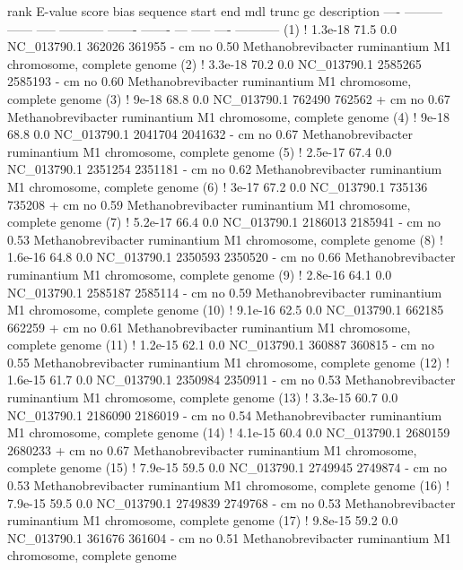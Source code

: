 \begin{sreoutput}
 rank     E-value  score  bias  sequence      start     end   mdl trunc   gc  description
 ----   --------- ------ -----  ----------- ------- -------   --- ----- ----  -----------
  (1) !   1.3e-18   71.5   0.0  NC_013790.1  362026  361955 -  cm    no 0.50  Methanobrevibacter ruminantium M1 chromosome, complete genome
  (2) !   3.3e-18   70.2   0.0  NC_013790.1 2585265 2585193 -  cm    no 0.60  Methanobrevibacter ruminantium M1 chromosome, complete genome
  (3) !     9e-18   68.8   0.0  NC_013790.1  762490  762562 +  cm    no 0.67  Methanobrevibacter ruminantium M1 chromosome, complete genome
  (4) !     9e-18   68.8   0.0  NC_013790.1 2041704 2041632 -  cm    no 0.67  Methanobrevibacter ruminantium M1 chromosome, complete genome
  (5) !   2.5e-17   67.4   0.0  NC_013790.1 2351254 2351181 -  cm    no 0.62  Methanobrevibacter ruminantium M1 chromosome, complete genome
  (6) !     3e-17   67.2   0.0  NC_013790.1  735136  735208 +  cm    no 0.59  Methanobrevibacter ruminantium M1 chromosome, complete genome
  (7) !   5.2e-17   66.4   0.0  NC_013790.1 2186013 2185941 -  cm    no 0.53  Methanobrevibacter ruminantium M1 chromosome, complete genome
  (8) !   1.6e-16   64.8   0.0  NC_013790.1 2350593 2350520 -  cm    no 0.66  Methanobrevibacter ruminantium M1 chromosome, complete genome
  (9) !   2.8e-16   64.1   0.0  NC_013790.1 2585187 2585114 -  cm    no 0.59  Methanobrevibacter ruminantium M1 chromosome, complete genome
 (10) !   9.1e-16   62.5   0.0  NC_013790.1  662185  662259 +  cm    no 0.61  Methanobrevibacter ruminantium M1 chromosome, complete genome
 (11) !   1.2e-15   62.1   0.0  NC_013790.1  360887  360815 -  cm    no 0.55  Methanobrevibacter ruminantium M1 chromosome, complete genome
 (12) !   1.6e-15   61.7   0.0  NC_013790.1 2350984 2350911 -  cm    no 0.53  Methanobrevibacter ruminantium M1 chromosome, complete genome
 (13) !   3.3e-15   60.7   0.0  NC_013790.1 2186090 2186019 -  cm    no 0.54  Methanobrevibacter ruminantium M1 chromosome, complete genome
 (14) !   4.1e-15   60.4   0.0  NC_013790.1 2680159 2680233 +  cm    no 0.67  Methanobrevibacter ruminantium M1 chromosome, complete genome
 (15) !   7.9e-15   59.5   0.0  NC_013790.1 2749945 2749874 -  cm    no 0.53  Methanobrevibacter ruminantium M1 chromosome, complete genome
 (16) !   7.9e-15   59.5   0.0  NC_013790.1 2749839 2749768 -  cm    no 0.53  Methanobrevibacter ruminantium M1 chromosome, complete genome
 (17) !   9.8e-15   59.2   0.0  NC_013790.1  361676  361604 -  cm    no 0.51  Methanobrevibacter ruminantium M1 chromosome, complete genome

\end{sreoutput}
